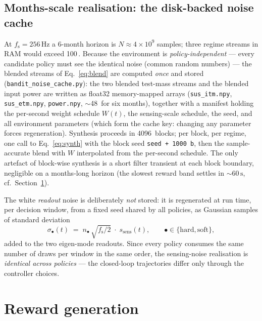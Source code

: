 \documentclass[11pt,a4paper]{article}
\newcommand{\SI}[2]{#1\,\text{#2}}
\newcommand{\code}[1]{\texttt{#1}}
\newcommand{\fs}{f_{\mathrm{s}}}
\begin{document}
\subsection{Months-scale realisation: the disk-backed noise cache}
\label{sec:cache}

At $\fs=\SI{256}{Hz}$ a 6-month horizon is $N \approx 4\times10^{9}$ samples; three
regime streams in RAM would exceed \SI{100}{GB}. Because the environment is
\emph{policy-independent} --- every candidate policy must see the identical noise (common
random numbers) --- the blended streams of Eq.~\eqref{eq:blend} are computed \emph{once}
and stored (\code{bandit\_noise\_cache.py}): the two blended test-mass streams and the
blended input power are written as float32 memory-mapped arrays
(\code{sus\_itm.npy}, \code{sus\_etm.npy}, \code{power.npy}, $\sim$\SI{48}{GB} for six
months), together with a manifest holding the per-second weight schedule $W(t)$, the
sensing-scale schedule, the seed, and all environment parameters (which form the cache
key: changing any parameter forces regeneration). Synthesis proceeds in
\SI{4096}{s} blocks; per block, per regime, one call to Eq.~\eqref{eq:synth} with the
block seed \code{seed + 1000\,b}, then the sample-accurate blend with $W$ interpolated
from the per-second schedule. The only artefact of block-wise synthesis is a short
filter transient at each block boundary, negligible on a months-long horizon (the
slowest reward band settles in $\sim\SI{60}{s}$, cf.\ Section~\ref{sec:reward}).

The white \emph{readout} noise is deliberately \emph{not} stored: it is regenerated at
run time, per decision window, from a fixed seed shared by all policies, as Gaussian
samples of standard deviation
\begin{equation}
  \sigma_{\bullet}(t) \;=\; n_{\bullet}\,\sqrt{\fs/2}\; \cdot\; s_{\mathrm{sens}}(t),
  \qquad \bullet \in \{\mathrm{hard}, \mathrm{soft}\},
\end{equation}
added to the two eigen-mode readouts. Since every policy consumes the same number of
draws per window in the same order, the sensing-noise realisation is \emph{identical
across policies} --- the closed-loop trajectories differ only through the controller
choices.

\section{Reward generation}
\label{sec:reward}
\end{document}
